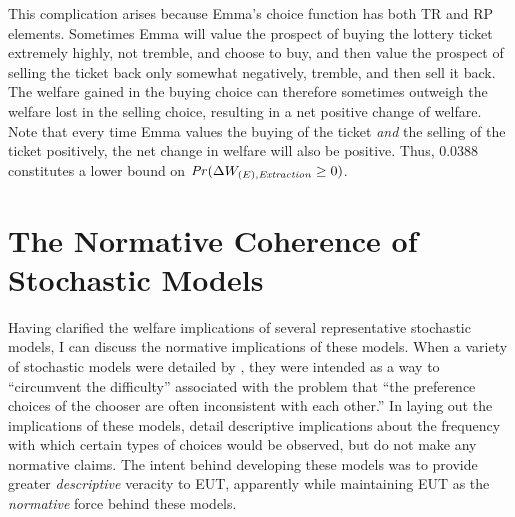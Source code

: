 \documentclass[../main.tex]{subfiles}
\begin{document}
This complication arises because Emma's choice function has both TR and RP elements.
Sometimes Emma will value the prospect of buying the lottery ticket extremely highly, not tremble, and choose to buy, and then value the prospect of selling the ticket back only somewhat negatively, tremble, and then sell it back.
The welfare gained in the buying choice can therefore sometimes outweigh the welfare lost in the selling choice, resulting in a net positive change of welfare.
Note that every time Emma values the buying of the ticket \textit{and} the selling of the ticket positively, the net change in welfare will also be positive.
Thus, $0.0388$ constitutes a lower bound on ${\mathit{Pr}}(\Delta W_{(E),\mathit{Extraction}} \geq 0)$.

\singlespacing
\section{The Normative Coherence of Stochastic Models}
\doublespacing



Having clarified the welfare implications of several representative stochastic models, I can discuss the normative implications of these models.
When a variety of stochastic models were detailed by \textcite{Becker1963}, they were intended as a way to \enquote{circumvent the difficulty} associated with the problem that \enquote{the preference choices of the chooser are often inconsistent with each other.}
In laying out the implications of these models, \textcite{Becker1963} detail descriptive implications about the frequency with which certain types of choices would be observed, but do not make any normative claims.
The intent behind developing these models was to provide greater \textit{descriptive} veracity to EUT, apparently while maintaining EUT as the \textit{normative} force behind these models.
\end{document}
